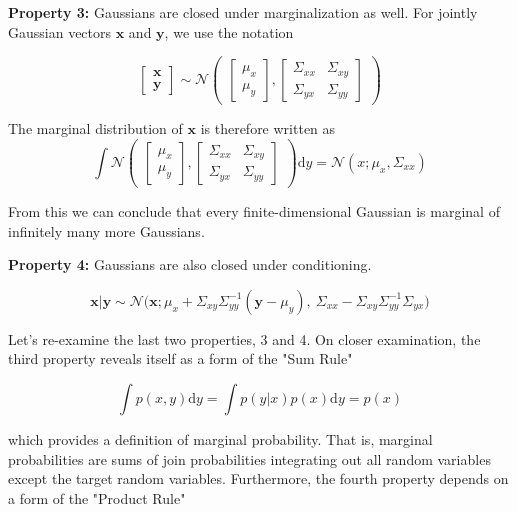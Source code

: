 \documentclass[12pt]{article}
\begin{document}
\textbf{Property 3:} Gaussians are closed under marginalization as well. For jointly Gaussian vectors $\textbf{x}$ and $\textbf{y}$, we use the notation

\[
\begin{bmatrix}
  \textbf{x} \\  \textbf{y}
\end{bmatrix}
\sim\mathcal{N}
\begin{pmatrix}\begin{bmatrix}
  \mu_x \\ \mu_y
\end{bmatrix}, 
\begin{bmatrix}
\Sigma_{xx} & \Sigma_{xy} \\ \Sigma_{yx} & \Sigma_{yy} 
\end{bmatrix}\end{pmatrix}
\]

The marginal distribution of $\textbf{x}$ is therefore written as
\[
\int\mathcal{N}
\begin{pmatrix}\begin{bmatrix}
  \mu_x \\ \mu_y
\end{bmatrix}, 
\begin{bmatrix}
\Sigma_{xx} & \Sigma_{xy} \\ \Sigma_{yx} & \Sigma_{yy} 
\end{bmatrix}\end{pmatrix}\mbox{d}y
=\mathcal{N}(x;\mu_x, \Sigma_{xx})
\]


From this we can conclude that every finite-dimensional Gaussian is marginal of infinitely many more Gaussians. 

\textbf{Property 4:} Gaussians are also closed under conditioning. 

\begin{equation}
\textbf{x} | \textbf{y}\sim\mathcal{N}\big(\textbf{x}; \mu_x+\Sigma_{xy}\Sigma^{-1}_{yy}(\textbf{y}-\mu_y), \ \Sigma_{xx}-\Sigma_{xy}\Sigma^{-1}_{yy}\Sigma_{yx}\big)
\end{equation}

Let's re-examine the last two properties, 3 and 4. On closer examination, the third property reveals itself as a form of the "Sum Rule"

\begin{equation}
\int p(x,y)\mbox{d}y=\int p(y|x)p(x)\mbox{d}y=p(x)
\end{equation}

which provides a definition of marginal probability. That is, marginal probabilities are sums of join probabilities integrating out all random variables except the target random variables. Furthermore, the fourth property depends on a form of the "Product Rule" 
\end{document}
